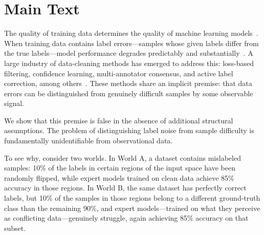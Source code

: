 \documentclass[12pt,a4paper]{article}
\author{SCX\ }
\begin{document}
\maketitle

\begin{abstract}
All machine learning depends on data quality, yet the field lacks a rigorous understanding of when data errors can be detected at all. Here we prove a fundamental impossibility: distinguishing mislabeled samples from intrinsically difficult-but-correct samples is mathematically impossible from observational data alone. We identify the minimal set of structural assumptions that break this impossibility---disjoint expert training, uniform noise, and state-homogeneous error rates---and prove that under these conditions, multi-expert consistency detects label noise with an exponential convergence rate that is minimax optimal, including the exact asymptotic constant. The theoretical bounds are empirically tight: on a materials science benchmark, the predicted detection limit matches the observed F1 score exactly. Our results establish that every data-cleaning method makes implicit assumptions that must be stated for its claims to be scientifically meaningful, and provide both the necessary conditions and the optimal algorithm for the problem.
\end{abstract}

\section{Main Text}

The quality of training data determines the quality of machine learning models~\cite{placeholder}. When training data contains label errors---samples whose given labels differ from the true labels---model performance degrades predictably and substantially~\cite{placeholder}. A large industry of data-cleaning methods has emerged to address this: loss-based filtering, confidence learning, multi-annotator consensus, and active label correction, among others~\cite{placeholder}. These methods share an implicit premise: that data errors can be distinguished from genuinely difficult samples by some observable signal.

We show that this premise is false in the absence of additional structural assumptions. The problem of distinguishing label noise from sample difficulty is fundamentally unidentifiable from observational data.

To see why, consider two worlds. In World A, a dataset contains mislabeled samples: 10\% of the labels in certain regions of the input space have been randomly flipped, while expert models trained on clean data achieve 85\% accuracy in those regions. In World B, the same dataset has perfectly correct labels, but 10\% of the samples in those regions belong to a different ground-truth class than the remaining 90\%, and expert models---trained on what they perceive as conflicting data---genuinely struggle, again achieving 85\% accuracy on that subset.
\end{document}
